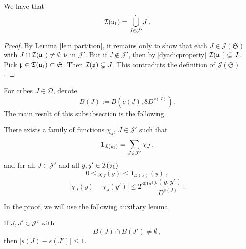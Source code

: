 {    \begin{lemma}
        \label{lem J' partition}
        We have that
        $$
            \mathcal{I}(\mathfrak u_1) = \dot{\bigcup_{J \in \mathcal{J}'}} J\,.
        $$
    \end{lemma}

    \begin{proof}
        By Lemma \ref{lem partition}, it remains only to show that each $J \in \mathcal{J}(\mathfrak{S})$ with $J \cap \mathcal{I}(\mathfrak u_1) \ne \emptyset$ is in $\mathcal{J}'$. But if $J \notin \mathcal{J}'$, then by \eqref{dyadicproperty} $\mathcal{I}(\mathfrak u_1) \subsetneq J$. Pick $\mathfrak p \in \mathfrak T(\mathfrak u_1) \subset \mathfrak{S}$.  Then $\mathcal{I}(\mathfrak p) \subsetneq J$. This contradicts the definition of $\mathcal{J}(\mathfrak{S})$.
    \end{proof}

    For cubes $J \in \mathcal{D}$, denote
    \begin{equation}
        \label{def BJ}
        B(J) := B(c(J), 8D^{s(J)}).
    \end{equation}
    The main result of this subsubsection is the following.

    \begin{lemma}
        \label{lem partition of unity}
        There exists a family of functions $\chi_J$, $J \in \mathcal{J}'$ such that \begin{equation}
            \label{eq pao 1}
            \mathbf{1}_{\mathcal{I}(\mathfrak u_1)} = \sum_{J \in \mathcal{J}'} \chi_J\,,
        \end{equation}
        and for all $J \in \mathcal{J}'$ and all $y,y' \in \mathcal{I}(\mathfrak u_1)$
        \begin{equation}
            \label{eq pao 2}
            0 \leq \chi_J(y) \leq \mathbf{1}_{B(J)}(y)\,,
        \end{equation}
        \begin{equation}
            \label{eq pao 3}
            |\chi_J(y) - \chi_J(y')| \le 2^{301a^3}  \frac{\rho(y,y')}{D^{s(J)}}\,.
        \end{equation}
    \end{lemma}

    In the proof, we will use the following auxiliary lemma.

    \begin{lemma}
        \label{lem J' smooth}
        If $J, J' \in \mathcal{J'}$ with
        $$
            B(J) \cap B(J') \ne \emptyset\,,
        $$
        then $|s(J) - s(J')| \le 1$.
    \end{lemma}

}
